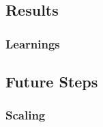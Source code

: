 \subsection{Results}

\subsubsection{Learnings}

\subsection{Future Steps}

\subsubsection{Scaling}


